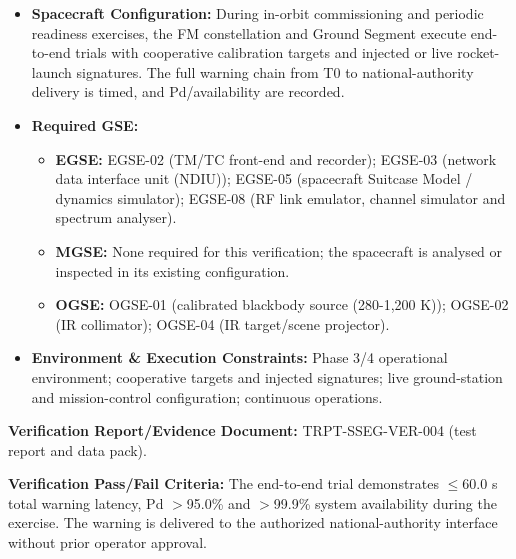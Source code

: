 \begin{itemize}
\item \textbf{Spacecraft Configuration:} During in-orbit commissioning and periodic readiness exercises, the FM constellation and Ground Segment execute end-to-end trials with cooperative calibration targets and injected or live rocket-launch signatures. The full warning chain from T0 to national-authority delivery is timed, and Pd/availability are recorded.
\item \textbf{Required GSE:}
\begin{itemize}
\item \textbf{EGSE:} EGSE-02 (TM/TC front-end and recorder); EGSE-03 (network data interface unit (NDIU)); EGSE-05 (spacecraft Suitcase Model / dynamics simulator); EGSE-08 (RF link emulator, channel simulator and spectrum analyser).
\item \textbf{MGSE:} None required for this verification; the spacecraft is analysed or inspected in its existing configuration.
\item \textbf{OGSE:} OGSE-01 (calibrated blackbody source (280-1,200 K)); OGSE-02 (IR collimator); OGSE-04 (IR target/scene projector).
\end{itemize}
\item \textbf{Environment \& Execution Constraints:} Phase 3/4 operational environment; cooperative targets and injected signatures; live ground-station and mission-control configuration; continuous operations.
\end{itemize}
\par\textbf{Verification Report/Evidence Document:} TRPT-SSEG-VER-004 (test report and data pack).
\par\textbf{Verification Pass/Fail Criteria:} The end-to-end trial demonstrates $\le$60.0 s total warning latency, Pd $>$95.0\% and $>$99.9\% system availability during the exercise. The warning is delivered to the authorized national-authority interface without prior operator approval.
\par\medskip

